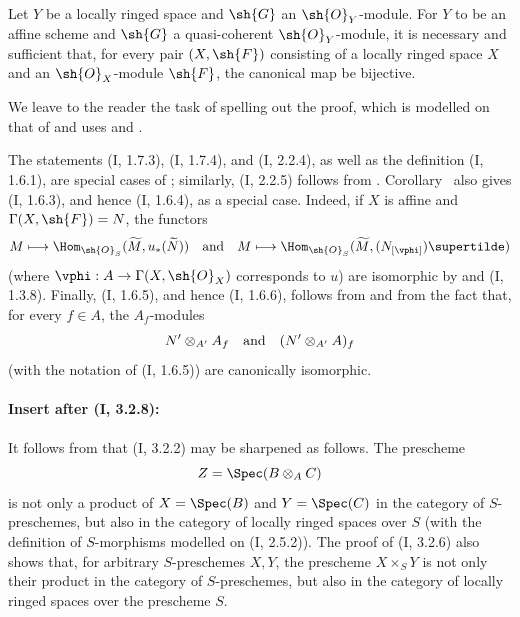 \begin{corollary}[1.8.10]
\label{I.1.8.10}
Let $Y$ be a locally ringed space and $\sh{G}$ an $\sh{O}_Y$-module.
For $Y$ to be an affine scheme and $\sh{G}$ a quasi-coherent
$\sh{O}_Y$-module, it is necessary and sufficient that, for every pair
$(X,\sh{F})$ consisting of a locally ringed space $X$ and an
$\sh{O}_X$-module $\sh{F}$, the canonical map  be
bijective.
\end{corollary}

We leave to the reader the task of spelling out the proof, which is
modelled on that of  and uses  and
.

\begin{remark}[1.8.11]
\label{I.1.8.11}
The statements (I, 1.7.3), (I, 1.7.4), and (I, 2.2.4), as well as the
definition (I, 1.6.1), are special cases of ;
similarly, (I, 2.2.5) follows from .
Corollary~ also gives (I, 1.6.3), and hence (I, 1.6.4),
as a special case.  Indeed, if $X$ is affine and
$\Gamma(X,\sh{F})=N$, the functors
\[
  M\longmapsto
  \Hom_{\sh{O}_S}(\widetilde M,u_*(\widetilde N))
  \quad\hbox{and}\quad
  M\longmapsto
  \Hom_{\sh{O}_S}(\widetilde M,(N_{[\vphi]})\supertilde)
\]
(where $\vphi:A\to\Gamma(X,\sh{O}_X)$ corresponds to $u$) are
isomorphic by  and (I, 1.3.8).  Finally, (I, 1.6.5),
and hence (I, 1.6.6), follows from  and from the fact
that, for every $f\in A$, the $A_f$-modules
\[
  N'\otimes_{A'}A_f
  \quad\hbox{and}\quad
  (N'\otimes_{A'}A)_f
\]
(with the notation of (I, 1.6.5)) are canonically isomorphic.
\end{remark}

\paragraph{Insert after (I, 3.2.8):}

\begin{env}[3.2.9]
\label{I.3.2.9}
It follows from  that (I, 3.2.2) may be sharpened as
follows.  The prescheme
\[
  Z=\Spec(B\otimes_A C)
\]
is not only a product of $X=\Spec(B)$ and $Y=\Spec(C)$ in the category
of $S$-preschemes, but also in the category of locally ringed spaces
over $S$ (with the definition of $S$-morphisms modelled on
(I, 2.5.2)).  The proof of (I, 3.2.6) also shows that, for arbitrary
$S$-preschemes $X,Y$, the prescheme $X\times_S Y$ is not only their
product in the category of $S$-preschemes, but also in the category of
locally ringed spaces over the prescheme $S$.
\end{env}

